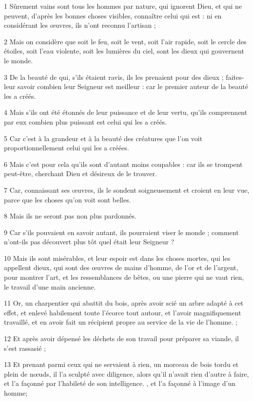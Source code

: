 
\par 1 Sûrement vains sont tous les hommes par nature, qui ignorent Dieu, et qui ne peuvent, d'après les bonnes choses visibles, connaître celui qui est : ni en considérant les œuvres, ils n'ont reconnu l'artisan ;
\par 2 Mais on considère que soit le feu, soit le vent, soit l'air rapide, soit le cercle des étoiles, soit l'eau violente, soit les lumières du ciel, sont les dieux qui gouvernent le monde.
\par 3 De la beauté de qui, s'ils étaient ravis, ils les prenaient pour des dieux ; faites-leur savoir combien leur Seigneur est meilleur : car le premier auteur de la beauté les a créés.
\par 4 Mais s'ils ont été étonnés de leur puissance et de leur vertu, qu'ils comprennent par eux combien plus puissant est celui qui les a créés.
\par 5 Car c'est à la grandeur et à la beauté des créatures que l'on voit proportionnellement celui qui les a créées.
\par 6 Mais c'est pour cela qu'ils sont d'autant moins coupables : car ils se trompent peut-être, cherchant Dieu et désireux de le trouver.
\par 7 Car, connaissant ses œuvres, ils le sondent soigneusement et croient en leur vue, parce que les choses qu'on voit sont belles.
\par 8 Mais ils ne seront pas non plus pardonnés.
\par 9 Car s'ils pouvaient en savoir autant, ils pourraient viser le monde ; comment n'ont-ils pas découvert plus tôt quel était leur Seigneur ?
\par 10 Mais ils sont misérables, et leur espoir est dans les choses mortes, qui les appellent dieux, qui sont des œuvres de mains d'homme, de l'or et de l'argent, pour montrer l'art, et les ressemblances de bêtes, ou une pierre qui ne vaut rien, le travail d'une main ancienne.
\par 11 Or, un charpentier qui abattit du bois, après avoir scié un arbre adapté à cet effet, et enlevé habilement toute l'écorce tout autour, et l'avoir magnifiquement travaillé, et en avoir fait un récipient propre au service de la vie de l'homme. ;
\par 12 Et après avoir dépensé les déchets de son travail pour préparer sa viande, il s'est rassasié ;
\par 13 Et prenant parmi ceux qui ne servaient à rien, un morceau de bois tordu et plein de nœuds, il l'a sculpté avec diligence, alors qu'il n'avait rien d'autre à faire, et l'a façonné par l'habileté de son intelligence. , et l'a façonné à l'image d'un homme;

